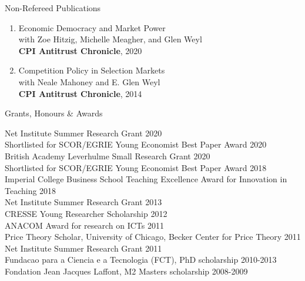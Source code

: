 \documentclass{resume}
\begin{document}

\begin{rSection}{Non-Refereed Publications}
	
\begin{enumerate}

\item Economic Democracy and Market Power\\
with Zoe Hitzig, Michelle Meagher, and Glen Weyl \\ 
\textbf{CPI Antitrust Chronicle}, 2020


\item Competition Policy in Selection Markets\\ 
with Neale Mahoney and E. Glen Weyl \\ 
\textbf{CPI Antitrust Chronicle}, 2014
	
		
\end{enumerate}


\end{rSection}




\begin{rSection}{Grants, Honours \& Awards}

Net Institute Summer Research Grant \hfill {2020}
\\ Shortlisted for SCOR/EGRIE Young Economist Best Paper Award \hfill 2020
\\ British Academy Leverhulme Small Research Grant \hfill 2020
\\ Shortlisted for SCOR/EGRIE Young Economist Best Paper Award \hfill 2018
\\Imperial College Business School Teaching Excellence Award for Innovation in Teaching \hfill 2018
\\ Net Institute Summer Research Grant \hfill {2013}
\\ CRESSE Young Researcher Scholarship \hfill {2012}
\\ ANACOM Award for research on ICTs \hfill {2011}
\\ Price Theory Scholar, University of Chicago, Becker Center for Price Theory \hfill {2011}
\\ Net Institute Summer Research Grant \hfill {2011}
\\ Fundacao para a Ciencia e a Tecnologia (FCT), PhD scholarship \hfill {2010-2013}
\\ Fondation Jean Jacques Laffont, M2 Masters scholarship \hfill 2008-2009

\end{rSection}
\end{document}
